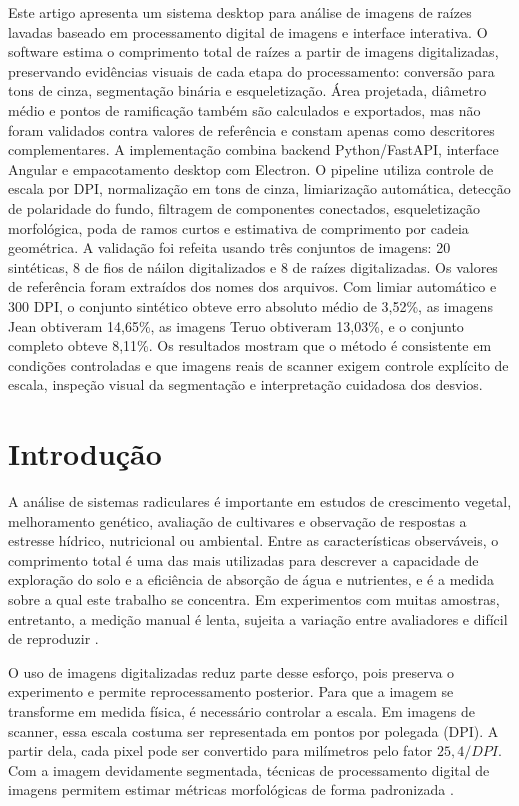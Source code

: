 \documentclass[12pt]{article}
\begin{document}
\begin{resumo}
Este artigo apresenta um sistema desktop para análise de imagens de raízes lavadas baseado em processamento digital de imagens e interface interativa. O software estima o comprimento total de raízes a partir de imagens digitalizadas, preservando evidências visuais de cada etapa do processamento: conversão para tons de cinza, segmentação binária e esqueletização. Área projetada, diâmetro médio e pontos de ramificação também são calculados e exportados, mas não foram validados contra valores de referência e constam apenas como descritores complementares. A implementação combina backend Python/FastAPI, interface Angular e empacotamento desktop com Electron. O pipeline utiliza controle de escala por DPI, normalização em tons de cinza, limiarização automática, detecção de polaridade do fundo, filtragem de componentes conectados, esqueletização morfológica, poda de ramos curtos e estimativa de comprimento por cadeia geométrica. A validação foi refeita usando três conjuntos de imagens: 20 sintéticas, 8 de fios de náilon digitalizados e 8 de raízes digitalizadas. Os valores de referência foram extraídos dos nomes dos arquivos. Com limiar automático e 300 DPI, o conjunto sintético obteve erro absoluto médio de 3,52\%, as imagens Jean obtiveram 14,65\%, as imagens Teruo obtiveram 13,03\%, e o conjunto completo obteve 8,11\%. Os resultados mostram que o método é consistente em condições controladas e que imagens reais de scanner exigem controle explícito de escala, inspeção visual da segmentação e interpretação cuidadosa dos desvios.
\end{resumo}

\section{Introdução}

A análise de sistemas radiculares é importante em estudos de crescimento vegetal, melhoramento genético, avaliação de cultivares e observação de respostas a estresse hídrico, nutricional ou ambiental. Entre as características observáveis, o comprimento total é uma das mais utilizadas para descrever a capacidade de exploração do solo e a eficiência de absorção de água e nutrientes, e é a medida sobre a qual este trabalho se concentra. Em experimentos com muitas amostras, entretanto, a medição manual é lenta, sujeita a variação entre avaliadores e difícil de reproduzir \cite{atkinson2019roots,lynch1995root}.

O uso de imagens digitalizadas reduz parte desse esforço, pois preserva o experimento e permite reprocessamento posterior. Para que a imagem se transforme em medida física, é necessário controlar a escala. Em imagens de scanner, essa escala costuma ser representada em pontos por polegada (DPI). A partir dela, cada pixel pode ser convertido para milímetros pelo fator $25,4 / DPI$. Com a imagem devidamente segmentada, técnicas de processamento digital de imagens permitem estimar métricas morfológicas de forma padronizada \cite{gonzalez2008digital,szeliski2010computer}.
\end{document}
